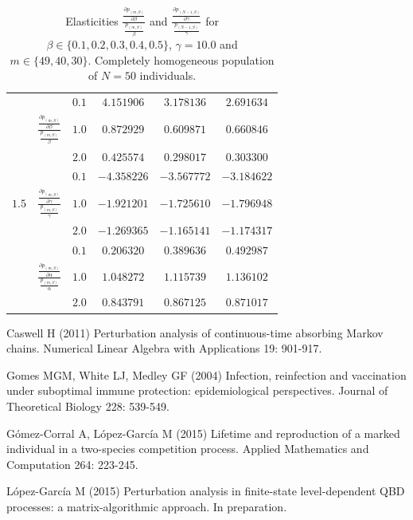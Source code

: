 \documentclass[10pt,A4paper]{article}
\begin{document}
\begin{table}[h]
\begin{tabular}{|c|c|c|c|c|c|}
\hline
 & & $0.1$ & $4.151906$ & $3.178136$ & $2.691634$ \\
\cline{3-6}
 & $\frac{\frac{\partial  p_{(m,S)}}{\partial \beta}}{\frac{p_{(m,S)}}{\beta}}$ & $1.0$ & $0.872929$ & $0.609871$ & $0.660846$ \\
\cline{3-6}
  & & $2.0$ & $0.425574$ & $0.298017$ & $0.303300$ \\
\cline{2-6}
 & & $0.1$ & $-4.358226$ & $-3.567772$ & $-3.184622$ \\
\cline{3-6}
$1.5$ & $\frac{\frac{\partial  p_{(m,S)}}{\partial \gamma}}{\frac{p_{(m,S)}}{\gamma}}$ & $1.0$ & $-1.921201$ & $-1.725610$ & $-1.796948$ \\
\cline{3-6}
 &  & $2.0$ & $-1.269365$ & $-1.165141$ & $-1.174317$ \\
\cline{2-6}
 & & $0.1$ & $0.206320$ & $0.389636$ & $0.492987$ \\
\cline{3-6}
 & $\frac{\frac{\partial  p_{(m,S)}}{\partial \alpha}}{\frac{p_{(m,S)}}{\alpha}}$ & $1.0$ & $1.048272$ & $1.115739$ & $1.136102$ \\
\cline{3-6}
 & & $2.0$ & $0.843791$ & $0.867125$ & $0.871017$ \\
\hline
\end{tabular}
\caption{Elasticities $\frac{\frac{\partial p_{(m,S)}}{\partial \beta}}{\frac{p_{(m,S)}}{\beta}}$ and $\frac{\frac{\partial p_{(N-1,S)}}{\partial \gamma}}{\frac{p_{(N-1,S)}}{\gamma}}$ for $\beta\in\{0.1,0.2,0.3,0.4,0.5\}$, $\gamma=10.0$
and $m\in\{49,40,30\}$. Completely homogeneous population of $N=50$ individuals.}
\label{tab:5}
\end{table}


\begin{thebibliography}{5}

Caswell H (2011)
Perturbation analysis of continuous-time absorbing Markov chains.
Numerical Linear Algebra with Applications 19: 901-917.

Gomes MGM, White LJ, Medley GF (2004)
Infection, reinfection and vaccination under suboptimal immune protection: epidemiological perspectives.
Journal of Theoretical Biology 228: 539-549.

G\'omez-Corral A, L\'opez-Garc\'ia M (2015)
Lifetime and reproduction of a marked individual in a two-species competition process.
Applied Mathematics and Computation 264: 223-245.

L\'opez-Garc\'ia M (2015)
Perturbation analysis in finite-state level-dependent QBD processes: a matrix-algorithmic approach.
In preparation.

\end{thebibliography}
\end{document}
